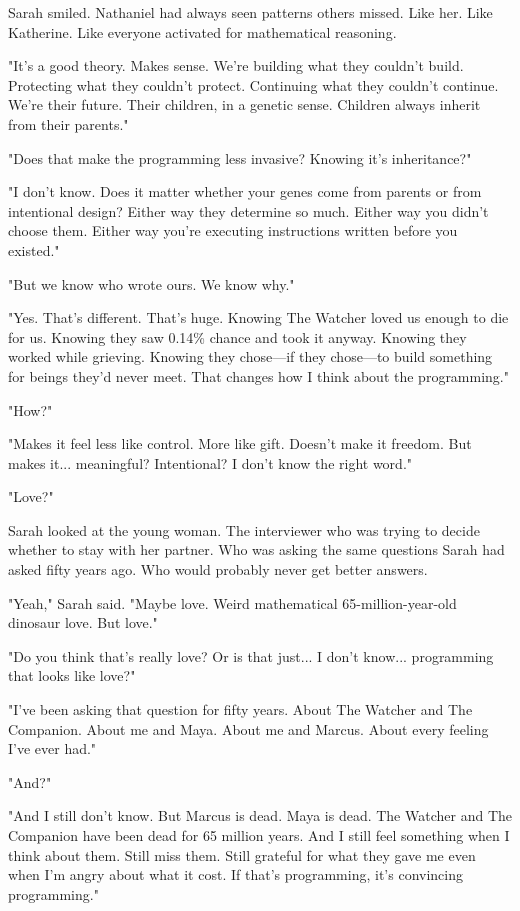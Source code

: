 Sarah smiled. Nathaniel had always seen patterns others missed. Like her. Like Katherine. Like everyone activated for mathematical reasoning.

"It's a good theory. Makes sense. We're building what they couldn't build. Protecting what they couldn't protect. Continuing what they couldn't continue. We're their future. Their children, in a genetic sense. Children always inherit from their parents."

"Does that make the programming less invasive? Knowing it's inheritance?"

"I don't know. Does it matter whether your genes come from parents or from intentional design? Either way they determine so much. Either way you didn't choose them. Either way you're executing instructions written before you existed."

"But we know who wrote ours. We know why."

"Yes. That's different. That's huge. Knowing The Watcher loved us enough to die for us. Knowing they saw 0.14\% chance and took it anyway. Knowing they worked while grieving. Knowing they chose—if they chose—to build something for beings they'd never meet. That changes how I think about the programming."

"How?"

"Makes it feel less like control. More like gift. Doesn't make it freedom. But makes it... meaningful? Intentional? I don't know the right word."

"Love?"

Sarah looked at the young woman. The interviewer who was trying to decide whether to stay with her partner. Who was asking the same questions Sarah had asked fifty years ago. Who would probably never get better answers.

"Yeah," Sarah said. "Maybe love. Weird mathematical 65-million-year-old dinosaur love. But love."

"Do you think that's really love? Or is that just... I don't know... programming that looks like love?"

"I've been asking that question for fifty years. About The Watcher and The Companion. About me and Maya. About me and Marcus. About every feeling I've ever had."

"And?"

"And I still don't know. But Marcus is dead. Maya is dead. The Watcher and The Companion have been dead for 65 million years. And I still feel something when I think about them. Still miss them. Still grateful for what they gave me even when I'm angry about what it cost. If that's programming, it's convincing programming."

